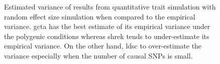 \begin{figure}
{				
				\label{fig:ldscInQtRandVarCom}
			}
			\caption[Estimation of Variance in Quantitative Trait Simulation]
			{Estimated variance of results from quantitative trait simulation with random effect size simulation when compared to the empirical variance.
			\gls{gcta} has the best estimate of its empirical variance under the polygenic conditions whereas \gls{shrek} tends to under-estimate its empirical variance.
			On the other hand, \gls{ldsc} to over-estimate the variance especially when the number of causal \glspl{SNP} is small.
				} 
			\label{fig:QtRandVarCom}
		\end{figure}